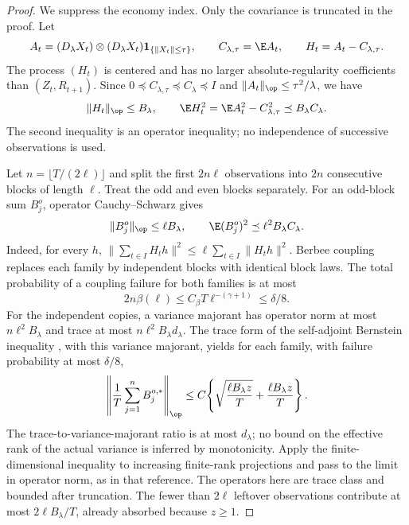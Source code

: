 \begin{proof}
We suppress the economy index. Only the covariance is truncated in the
proof. Let
\[
A_t=(D_\lambda X_t)\otimes(D_\lambda X_t)
       \mathbf1_{\{\|X_t\|\leq\tau\}},\qquad
C_{\lambda,\tau}=\E A_t,\qquad H_t=A_t-C_{\lambda,\tau}.
\]
The process $(H_t)$ is centered and has no larger absolute-regularity
coefficients than $(Z_t,R_{t+1})$. Since
$0\preceq C_{\lambda,\tau}\preceq C_\lambda\preceq I$ and
$\|A_t\|_{\op}\leq\tau^2/\lambda$, we have
\begin{equation}
\|H_t\|_{\op}\leq B_\lambda,\qquad
\E H_t^2=\E A_t^2-C_{\lambda,\tau}^2
\preceq B_\lambda C_\lambda.
\label{eq:truncated_operator_variance}
\end{equation}
The second inequality is an operator inequality; no independence of
successive observations is used.

Let $n=\lfloor T/(2\ell)\rfloor$ and split the first $2n\ell$
observations into $2n$ consecutive blocks of length $\ell$.
Treat the odd and even blocks separately. For an odd-block sum $B_j^o$,
operator Cauchy--Schwarz gives
\[
\|B_j^o\|_{\op}\leq\ell B_\lambda,\qquad
\E(B_j^o)^2\preceq\ell^2B_\lambda C_\lambda.
\]
Indeed, for every $h$, $\|\sum_{t\in I}H_th\|^2
\leq\ell\sum_{t\in I}\|H_th\|^2$.
Berbee coupling replaces each family by independent blocks with identical
block laws. The total probability of a coupling failure for both families is
at most
\[
2n\beta(\ell)\leq C_\beta T\ell^{-(\gamma+1)}\leq\delta/8.
\]
For the independent copies, a variance majorant has operator norm at most
$n\ell^2B_\lambda$ and trace at most $n\ell^2B_\lambda d_\lambda$.
The trace form of the self-adjoint Bernstein inequality
\citep[proof of Theorem~3.1 and Section~3.2]{minsker2017}, with this
variance majorant, yields for each family, with failure probability at most
$\delta/8$,
\[
\left\|\frac1T\sum_{j=1}^n B_j^{o,*}\right\|_{\op}
\leq C\!\left\{\sqrt{\frac{\ell B_\lambda z}{T}}
                       +\frac{\ell B_\lambda z}{T}\right\}.
\]
The trace-to-variance-majorant ratio is at most $d_\lambda$; no bound on
the effective rank of the actual variance is inferred by monotonicity.
Apply the finite-dimensional inequality to increasing finite-rank
projections and pass to the limit in operator norm, as in that reference.
The operators here are trace class and bounded after truncation.
The fewer than $2\ell$ leftover observations contribute at most
$2\ell B_\lambda/T$, already absorbed because $z\geq1$.


\end{proof}
